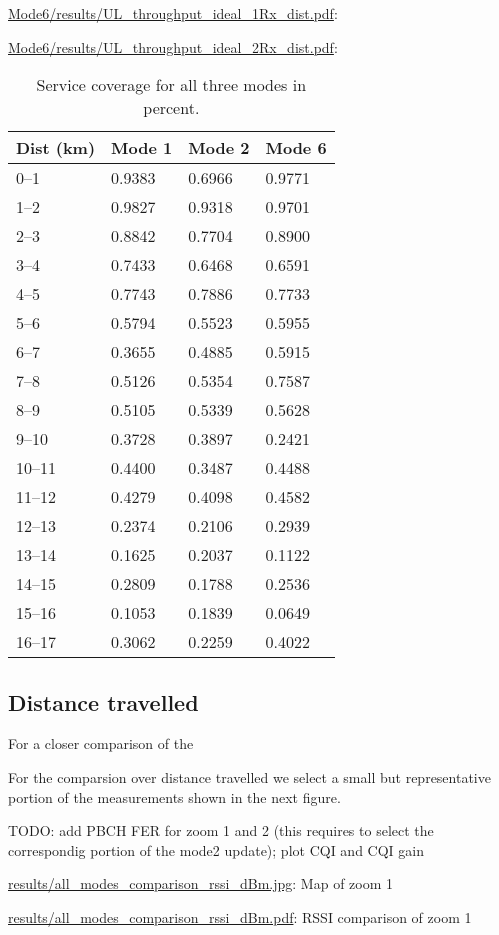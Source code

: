 \documentclass[a4paper,10pt]{article}
\newcommand{\printfile}[2][]{
 \begin{minipage}{8cm}
  \centering
  \url{#2}: #1

 \end{minipage}
}
\begin{document}
\printfile{Mode6/results/UL_throughput_ideal_1Rx_dist.pdf}
\printfile{Mode6/results/UL_throughput_ideal_2Rx_dist.pdf}

\begin{table}
\centering
\begin{tabular}{l|l|l|l}
Dist (km) & Mode 1 & Mode 2 & Mode 6\\
\hline
0--1 &   0.9383 &   0.6966 &   0.9771\\
1--2 &   0.9827 &   0.9318 &   0.9701\\
2--3 &   0.8842 &   0.7704 &   0.8900\\
3--4 &   0.7433 &   0.6468 &   0.6591\\
4--5 &   0.7743 &   0.7886 &   0.7733\\
5--6 &   0.5794 &   0.5523 &   0.5955\\
6--7 &   0.3655 &   0.4885 &   0.5915\\
7--8 &   0.5126 &   0.5354 &   0.7587\\
8--9 &   0.5105 &   0.5339 &   0.5628\\
9--10 &    0.3728 &   0.3897 &   0.2421\\
10--11 &   0.4400 &   0.3487 &   0.4488\\
11--12 &   0.4279 &   0.4098 &   0.4582\\
12--13 &   0.2374 &   0.2106 &   0.2939\\
13--14 &   0.1625 &   0.2037 &   0.1122\\
14--15 &   0.2809 &   0.1788 &   0.2536\\
15--16 &   0.1053 &   0.1839 &   0.0649\\
16--17 &   0.3062 &   0.2259 &   0.4022\\
\end{tabular}
\caption{Service coverage for all three modes in percent.}
\end{table}

\subsection{Distance travelled}
\label{sec:dist_travelled}
For a closer comparison of the 

For the comparsion over distance travelled we select a small but representative portion of the measurements shown in the next figure.

TODO: add PBCH FER for zoom 1 and 2 (this requires to select the correspondig portion of the mode2 update); plot CQI and CQI gain


\printfile[Map of zoom 1]{results/all_modes_comparison_rssi_dBm.jpg}
\printfile[RSSI comparison of zoom 1]{results/all_modes_comparison_rssi_dBm.pdf}
\end{document}
